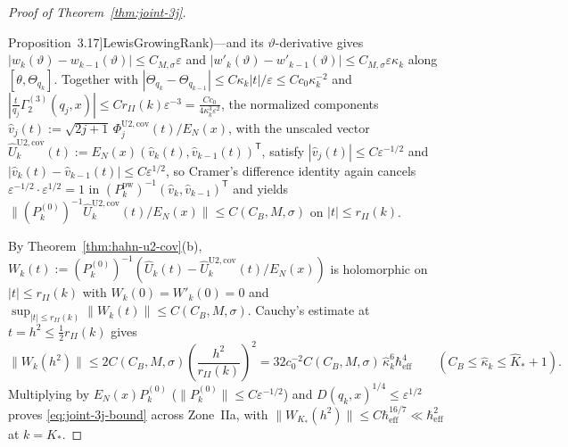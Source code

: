 \documentclass[11pt]{article}
\theoremstyle{definition}
\theoremstyle{remark}
\newcommand{\heff}{\hbar_{\mathrm{eff}}}
\renewcommand{\_}{\oldunderscore\penalty0\hskip0pt\relax}
\begin{document}
\begin{proof}[Proof of Theorem~\ref{thm:joint-3j}]
\begin{enumerate}[leftmargin=2em,itemsep=2pt]
  Proposition~3.17]{LewisGrowingRank})---and its $\vartheta$-derivative gives $|w_k(\vartheta)-w_{k-1}(\vartheta)|\le
  C_{M,\sigma}\varepsilon$ and $|w'_k(\vartheta)-w'_{k-1}(\vartheta)|\le C_{M,\sigma}\varepsilon\kappa_k$ along
  $[\theta,\Theta_{q_k}]$. Together with $|\Theta_{q_k}-\Theta_{q_{k-1}}|\le C\kappa_k|t|/\varepsilon\le Cc_0\kappa_k^{-2}$ and
  $|\frac{t}{q_j}\Gamma_2^{(3)}(q_j,x)|\le Cr_{II}(k)\varepsilon^{-3}=\frac{Cc_0}{4\kappa_k^3\varepsilon^2}$, the normalized
  components $\widehat{v}_j(t):=\sqrt{2j+1}\,\Phi_j^{\mathrm{U2,cov}}(t)/E_N(x)$, with the unscaled vector
  $\widehat{U}_k^{\mathrm{U2,cov}}(t):=E_N(x)(\widehat{v}_k(t),\widehat{v}_{k-1}(t))^{\mathsf T}$, satisfy $|\widehat{v}_j(t)|\le
  C\varepsilon^{-1/2}$ and $|\widehat{v}_k(t)-\widehat{v}_{k-1}(t)|\le C\varepsilon^{1/2}$, so Cramer's difference identity again
  cancels $\varepsilon^{-1/2}\cdot\varepsilon^{1/2}=1$ in
  $(P_k^{\mathrm{pw}})^{-1}(\widehat{v}_k,\widehat{v}_{k-1})^{\mathsf{T}}$ and yields
  $\|(P_k^{(0)})^{-1}\widehat{U}_k^{\mathrm{U2,cov}}(t)/E_N(x)\|\le C(C_B,M,\sigma)$ on $|t|\le r_{II}(k)$.
\end{enumerate}
By Theorem~\ref{thm:hahn-u2-cov}(b), $W_k(t):=(P_k^{(0)})^{-1}(\widehat{U}_k(t)-\widehat{U}_k^{\mathrm{U2,cov}}(t)/E_N(x))$ is
  holomorphic on $|t|\le r_{II}(k)$ with $W_k(0)=W'_k(0)=0$ and $\sup_{|t|\le r_{II}(k)}\|W_k(t)\|\le C(C_B,M,\sigma)$. Cauchy's
  estimate at $t=h^2\le\frac12 r_{II}(k)$ gives
\begin{equation}
  \bigl\|W_k(h^2)\bigr\| \le 2C(C_B,M,\sigma)\!\left(\frac{h^2}{r_{II}(k)}\right)^2 =
    32c_0^{-2}C(C_B,M,\sigma)\,\hat{\kappa}_k^6\heff^4\qquad (C_B\le\hat{\kappa}_k\le\hat{K}_*+1).
  \label{eq:zone-IIa-vector-bound}
\end{equation}
Multiplying by $E_N(x)P_k^{(0)}$ ($\|P_k^{(0)}\|\le C\varepsilon^{-1/2}$) and $D(q_k,x)^{1/4}\le\varepsilon^{1/2}$ proves
  \eqref{eq:joint-3j-bound} across Zone~IIa, with $\|W_{K_*}(h^2)\|\le C\heff^{16/7}\ll\heff^2$ at $k=K_*$.


\end{proof}
\end{document}
